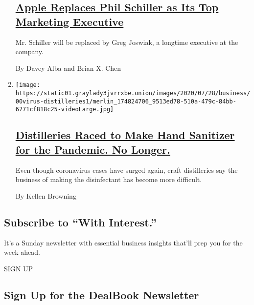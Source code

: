 \begin{enumerate}
  \hypertarget{apple-replaces-phil-schiller-as-its-top-marketing-executive}{%
  \subsection{\texorpdfstring{\href{/2020/08/04/technology/apple-schiller-marketing-executive-departure.html}{Apple
  Replaces Phil Schiller as Its Top Marketing
  Executive}}{Apple Replaces Phil Schiller as Its Top Marketing Executive}}\label{apple-replaces-phil-schiller-as-its-top-marketing-executive}}

  Mr. Schiller will be replaced by Greg Joswiak, a longtime executive at
  the company.

  By Davey Alba and Brian X. Chen
\item
  \texttt{[image: https://static01.graylady3jvrrxbe.onion/images/2020/07/28/business/00virus-distilleries1/merlin\_174824706\_9513ed78-510a-479c-84bb-6771cf818c25-videoLarge.jpg]}

  \hypertarget{distilleries-raced-to-make-hand-sanitizer-for-the-pandemic-no-longer}{%
  \subsection{\texorpdfstring{\href{/2020/08/04/business/distilleries-hand-sanitizer-pandemic.html}{Distilleries
  Raced to Make Hand Sanitizer for the Pandemic. No
  Longer.}}{Distilleries Raced to Make Hand Sanitizer for the Pandemic. No Longer.}}\label{distilleries-raced-to-make-hand-sanitizer-for-the-pandemic-no-longer}}

  Even though coronavirus cases have surged again, craft distilleries
  say the business of making the disinfectant has become more difficult.

  By Kellen Browning
\end{enumerate}

\hypertarget{subscribe-to-with-interest}{%
\subsection{Subscribe to ``With
Interest.''}\label{subscribe-to-with-interest}}

It's a Sunday newsletter with essential business insights that'll prep
you for the week ahead.

SIGN UP

\hypertarget{sign-up-for-the-dealbook-newsletter}{%
\subsection{Sign Up for the DealBook
Newsletter}\label{sign-up-for-the-dealbook-newsletter}}

